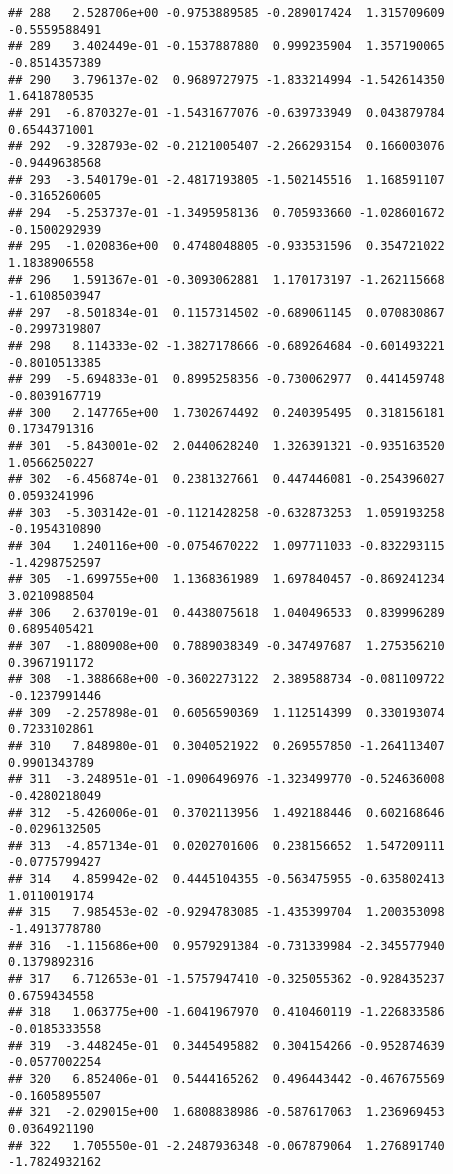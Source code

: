 \documentclass[
]{article}
\begin{document}
\begin{verbatim}
## 288   2.528706e+00 -0.9753889585 -0.289017424  1.315709609 -0.5559588491
## 289   3.402449e-01 -0.1537887880  0.999235904  1.357190065 -0.8514357389
## 290   3.796137e-02  0.9689727975 -1.833214994 -1.542614350  1.6418780535
## 291  -6.870327e-01 -1.5431677076 -0.639733949  0.043879784  0.6544371001
## 292  -9.328793e-02 -0.2121005407 -2.266293154  0.166003076 -0.9449638568
## 293  -3.540179e-01 -2.4817193805 -1.502145516  1.168591107 -0.3165260605
## 294  -5.253737e-01 -1.3495958136  0.705933660 -1.028601672 -0.1500292939
## 295  -1.020836e+00  0.4748048805 -0.933531596  0.354721022  1.1838906558
## 296   1.591367e-01 -0.3093062881  1.170173197 -1.262115668 -1.6108503947
## 297  -8.501834e-01  0.1157314502 -0.689061145  0.070830867 -0.2997319807
## 298   8.114333e-02 -1.3827178666 -0.689264684 -0.601493221 -0.8010513385
## 299  -5.694833e-01  0.8995258356 -0.730062977  0.441459748 -0.8039167719
## 300   2.147765e+00  1.7302674492  0.240395495  0.318156181  0.1734791316
## 301  -5.843001e-02  2.0440628240  1.326391321 -0.935163520  1.0566250227
## 302  -6.456874e-01  0.2381327661  0.447446081 -0.254396027  0.0593241996
## 303  -5.303142e-01 -0.1121428258 -0.632873253  1.059193258 -0.1954310890
## 304   1.240116e+00 -0.0754670222  1.097711033 -0.832293115 -1.4298752597
## 305  -1.699755e+00  1.1368361989  1.697840457 -0.869241234  3.0210988504
## 306   2.637019e-01  0.4438075618  1.040496533  0.839996289  0.6895405421
## 307  -1.880908e+00  0.7889038349 -0.347497687  1.275356210  0.3967191172
## 308  -1.388668e+00 -0.3602273122  2.389588734 -0.081109722 -0.1237991446
## 309  -2.257898e-01  0.6056590369  1.112514399  0.330193074  0.7233102861
## 310   7.848980e-01  0.3040521922  0.269557850 -1.264113407  0.9901343789
## 311  -3.248951e-01 -1.0906496976 -1.323499770 -0.524636008 -0.4280218049
## 312  -5.426006e-01  0.3702113956  1.492188446  0.602168646 -0.0296132505
## 313  -4.857134e-01  0.0202701606  0.238156652  1.547209111 -0.0775799427
## 314   4.859942e-02  0.4445104355 -0.563475955 -0.635802413  1.0110019174
## 315   7.985453e-02 -0.9294783085 -1.435399704  1.200353098 -1.4913778780
## 316  -1.115686e+00  0.9579291384 -0.731339984 -2.345577940  0.1379892316
## 317   6.712653e-01 -1.5757947410 -0.325055362 -0.928435237  0.6759434558
## 318   1.063775e+00 -1.6041967970  0.410460119 -1.226833586 -0.0185333558
## 319  -3.448245e-01  0.3445495882  0.304154266 -0.952874639 -0.0577002254
## 320   6.852406e-01  0.5444165262  0.496443442 -0.467675569 -0.1605895507
## 321  -2.029015e+00  1.6808838986 -0.587617063  1.236969453  0.0364921190
## 322   1.705550e-01 -2.2487936348 -0.067879064  1.276891740 -1.7824932162

\end{verbatim}
\end{document}
